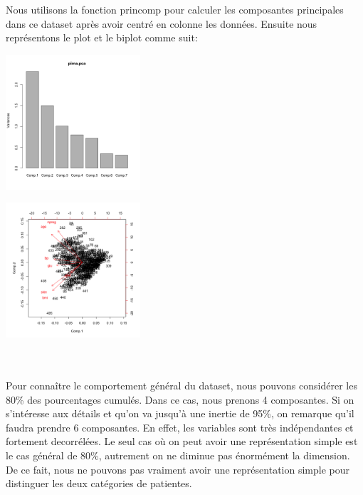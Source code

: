 \documentclass[10pt]{article}
\begin{document}
Nous utilisons la fonction princomp pour calculer les composantes principales dans ce dataset après avoir centré en colonne les données. Ensuite nous représentons le plot et le biplot comme suit:
\\
\begin{minipage}{.5\textwidth}
	\centering
	\includegraphics[width=50mm]{Figures/Pima/pca_plot.png}
	\label{fig:pima_pca_plot}
\end{minipage}%
\hspace{0.08\linewidth}
\begin{minipage}{.5\textwidth}
	\centering
	\includegraphics[width=50mm]{Figures/Pima/pca_biplot.png}
	\label{fig:pima_pca_biplot}
\end{minipage}
\\
\\
Pour connaître le comportement général du dataset, nous pouvons considérer les 80\% des pourcentages cumulés. Dans ce cas, nous prenons 4 composantes. Si on s'intéresse aux détails et qu'on va jusqu'à une inertie de 95\%, on remarque qu'il faudra prendre 6 composantes. En effet, les variables sont très indépendantes et fortement decorrélées. Le seul cas où on peut avoir une représentation simple est le cas général de 80\%, autrement on ne diminue pas énormément la dimension. De ce fait, nous ne pouvons pas vraiment avoir une représentation simple pour distinguer les deux catégories de patientes.
	
\end{document}
